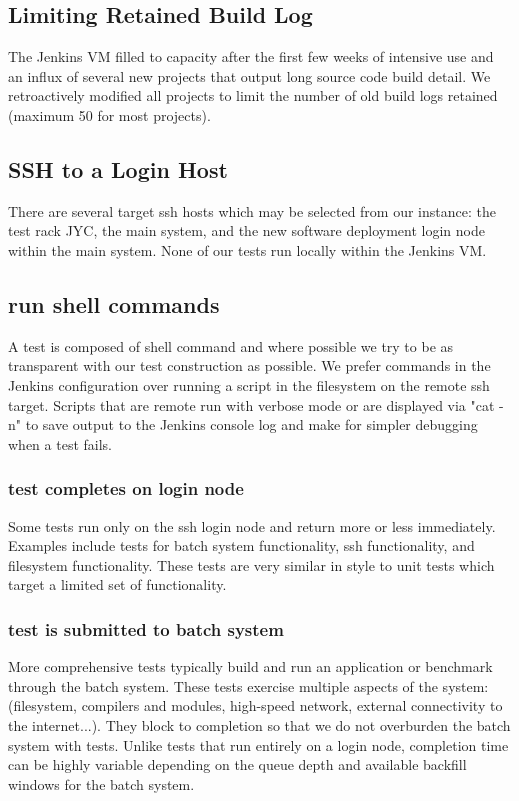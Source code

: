 \documentclass[10pt, conference, compsocconf]{IEEEtran}
\begin{document}
{\subsection{Limiting Retained Build Log}
The Jenkins VM filled to capacity after the first few weeks of intensive use and an influx of several new projects that output long source code build detail. 
We retroactively modified all projects to limit the number of old build logs retained (maximum 50 for most projects). 

\subsection{SSH to a Login Host}
There are several target ssh hosts which may be selected from our instance: the test rack JYC, the main system, and the new software deployment login node within the main system. 
 None of our tests run locally within the Jenkins VM.
\subsection{run shell commands}
A test is composed of shell command and where possible we try to be as transparent with our test construction as possible. 
We prefer commands in the Jenkins configuration over running a script in the filesystem on the remote ssh target. 
Scripts that are remote run with verbose mode or are displayed via "cat -n" to save output to the Jenkins console log and make for simpler debugging when a test fails.
\subsubsection{test completes on login node}
Some tests run only on the ssh login node and return more or less immediately. 
 Examples include tests for batch system functionality, ssh functionality, and filesystem functionality. 
 These tests are very similar in style to unit tests which target a limited set of functionality.
\subsubsection{test is submitted to batch system}
More comprehensive tests typically build and run an application or benchmark through the batch system. 
 These tests exercise multiple aspects of the system: (filesystem, compilers and modules, high-speed network, external connectivity to the internet...). 
 They block to completion so that we do not overburden the batch system with tests. 
 Unlike tests that run entirely on a login node, completion time can be highly variable depending on the queue depth and available backfill windows for the batch system.
}
\end{document}
